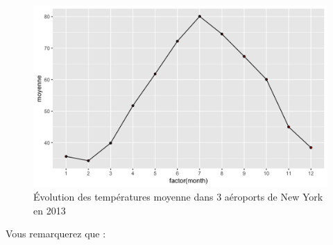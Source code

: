 \documentclass[a4paperpaper,]{article}
\theoremstyle{definition}
\theoremstyle{definition}
\theoremstyle{definition}
\theoremstyle{remark}
\begin{document}
\begin{figure}[htpb]

{\centering \includegraphics[width=0.9\linewidth]{figure/errorbars-1} 

}

\caption{Évolution des températures moyenne dans 3 aéroports de New York en 2013}\label{fig:errorbars}
\end{figure}

Vous remarquerez que :
\end{document}
